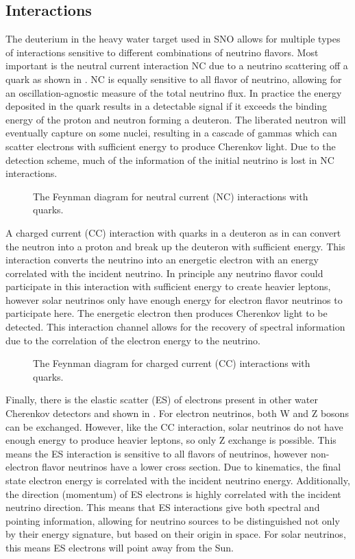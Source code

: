 \subsection{Interactions}

The deuterium in the heavy water target used in SNO allows for multiple types of interactions sensitive to different combinations of neutrino flavors.
Most important is the neutral current interaction NC due to a neutrino scattering off a quark as shown in .
NC is equally sensitive to all flavor of neutrino, allowing for an oscillation-agnostic measure of the total neutrino flux.
In practice the energy deposited in the quark results in a detectable signal if it exceeds the binding energy of the proton and neutron forming a deuteron.
The liberated neutron will eventually capture on some nuclei, resulting in a cascade of gammas which can scatter electrons with sufficient energy to produce Cherenkov light.
Due to the detection scheme, much of the information of the initial neutrino is lost in NC interactions.

\begin{figure}
\centering
\caption{\label{fig:NC}The Feynman diagram for neutral current (NC) interactions with quarks.}
\end{figure}

A charged current (CC) interaction with quarks in a deuteron as in  can convert the neutron into a proton and break up the deuteron with sufficient energy.
This interaction converts the neutrino into an energetic electron with an energy correlated with the incident neutrino.
In principle any neutrino flavor could participate in this interaction with sufficient energy to create heavier leptons, however solar neutrinos only have enough energy for electron flavor neutrinos to participate here.
The energetic electron then produces Cherenkov light to be detected.
This interaction channel allows for the recovery of spectral information due to the correlation of the electron energy to the neutrino.

\begin{figure}
\centering
\caption{\label{fig:CC}The Feynman diagram for charged current (CC) interactions with quarks.}
\end{figure}

Finally, there is the elastic scatter (ES) of electrons present in other water Cherenkov detectors and shown in .
For electron neutrinos, both W and Z bosons can be exchanged.
However, like the CC interaction, solar neutrinos do not have enough energy to produce heavier leptons, so only Z exchange is possible.
This means the ES interaction is sensitive to all flavors of neutrinos, however non-electron flavor neutrinos have a lower cross section.
Due to kinematics, the final state electron energy is correlated with the incident neutrino energy.
Additionally, the direction (momentum) of ES electrons is highly correlated with the incident neutrino direction.
This means that ES interactions give both spectral and pointing information, allowing for neutrino sources to be distinguished not only by their energy signature, but based on their origin in space.
For solar neutrinos, this means ES electrons will point away from the Sun.

